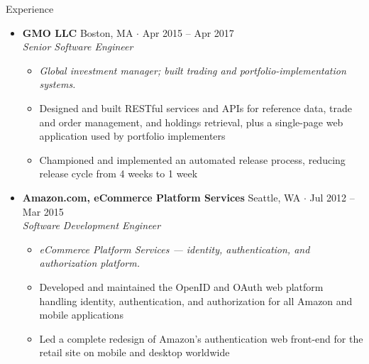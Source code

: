 \documentclass[10pt,oneside]{article}
\newenvironment{ressection}[1]{
  \vspace{4pt}
  {\fontfamily{phv}\selectfont\Large#1}
  \begin{itemize}
    \vspace{3pt}
}{
  \end{itemize}
}
\newcommand{\ressubitem}[1]{
  \vspace{-1pt}
\item \begin{flushleft} #1 \end{flushleft}
}
\newcommand{\rescontext}[1]{
  \vspace{-3pt}
\item[] \begin{flushleft} \textit{\small #1} \end{flushleft}
}
\newcommand{\resbigitem}[3]{
  \vspace{-5pt}
\item
  \textbf{#1} \hfill #2 \\
  \textit{#3}
}
\newenvironment{ressubsec}[3]{
  \resbigitem{#1}{#2}{#3}
  \vspace{-2pt}
  \begin{itemize}
}{
  \end{itemize}
}
\begin{document}
\begin{ressection}{Experience}
  \begin{ressubsec}{GMO LLC}{Boston, MA \; $\cdot$ \; Apr 2015 -- Apr 2017}{Senior Software Engineer}
    \rescontext{Global investment manager; built trading and portfolio-implementation systems.}
    \ressubitem{Designed and built RESTful services and APIs for reference data, trade and order management, and holdings retrieval, plus a single-page web application used by portfolio implementers}
    \ressubitem{Championed and implemented an automated release process, reducing release cycle from 4 weeks to 1 week}
  \end{ressubsec}

  \begin{ressubsec}{Amazon.com, eCommerce Platform Services}{Seattle, WA \; $\cdot$ \; Jul 2012 -- Mar 2015}{Software Development Engineer}
    \rescontext{eCommerce Platform Services --- identity, authentication, and authorization platform.}
    \ressubitem{Developed and maintained the OpenID and OAuth web platform handling identity, authentication, and authorization for all Amazon and mobile applications}
    \ressubitem{Led a complete redesign of Amazon's authentication web front-end for the retail site on mobile and desktop worldwide}
  \end{ressubsec}

\end{ressection}
\end{document}
